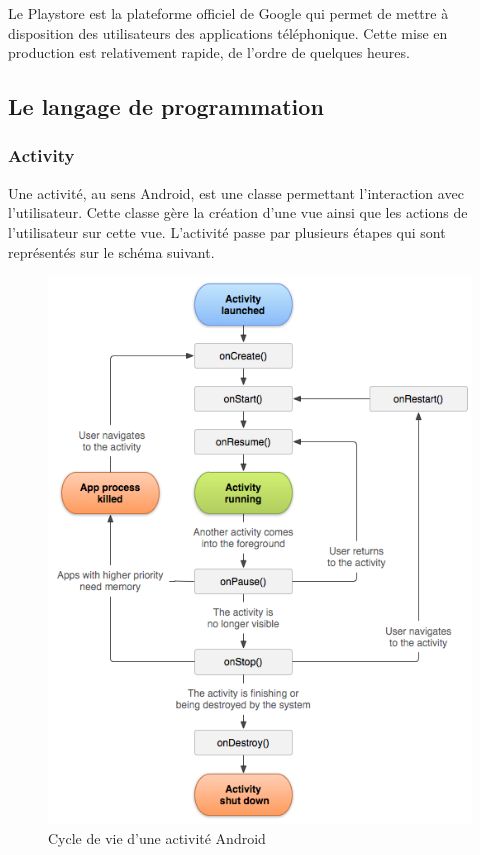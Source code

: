 Le Playstore est la plateforme officiel de Google qui permet de mettre à disposition des utilisateurs des applications téléphonique. Cette mise en production est relativement rapide, de l'ordre de quelques heures.

\subsection{Le langage de programmation}

\subsubsection{Activity}

Une activité, au sens Android, est une classe permettant l’interaction avec l'utilisateur. Cette classe gère la création d'une vue ainsi que les actions de l'utilisateur sur cette vue. L'activité passe par plusieurs étapes qui sont représentés sur le schéma suivant.

\begin{figure}[!h]
	\centering
	\includegraphics[scale=0.6]{img/activity_lifecycle.png}
	\caption{\label{activity_lifecycle} Cycle de vie d'une activité Android}
\end{figure}

